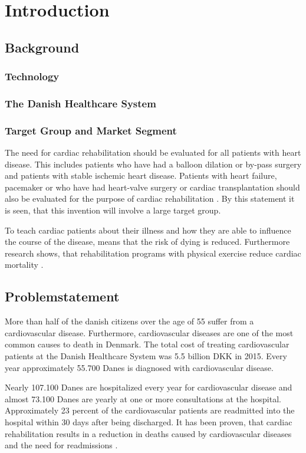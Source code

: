 \chapter{Introduction}

\section{Background}
\subsection{Technology}
\subsection{The Danish Healthcare System}
\subsection{Target Group and Market Segment}

The need for cardiac rehabilitation should be evaluated for all patients with heart disease. This includes patients who have had a balloon dilation or by-pass surgery and patients with stable ischemic heart disease.
Patients with heart failure, pacemaker or who have had heart-valve surgery or cardiac transplantation should also be evaluated for the purpose of cardiac rehabilitation \cite{Rehabilitering}. By this statement it is seen, that this invention will involve a large target group. 

To teach cardiac patients about their illness and how they are able to influence the course of the disease, means that the risk of dying is reduced. Furthermore research shows, that rehabilitation programs with physical exercise reduce cardiac mortality \cite{Hjerteforening}.    


\section{Problemstatement}
More than half of the danish citizens over the age of 55 suffer from a cardiovascular disease. Furthermore, cardiovascular diseases are one of the most common causes to death in Denmark. The total cost of treating cardiovascular patients at the Danish Healthcare System was 5.5 billion DKK in 2015. Every year approximately 55.700 Danes is diagnosed with cardiovascular disease.   

Nearly 107.100 Danes are hospitalized every year for cardiovascular disease and almost 73.100 Danes are yearly at one or more consultations at the hospital. Approximately 23 percent of the cardiovascular patients are readmitted into the hospital within 30 days after being discharged. It has been proven, that cardiac rehabilitation results in a reduction in deaths caused by cardiovascular diseases and the need for readmissions \cite{Hjerteforening}.


